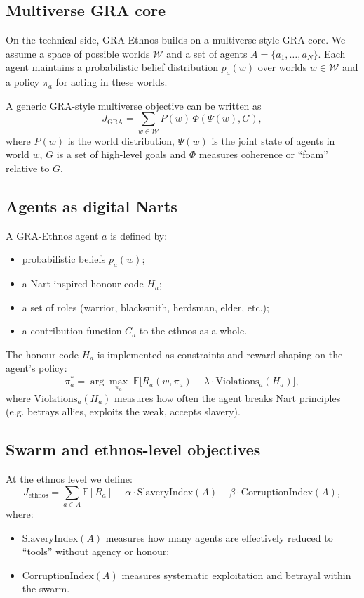 \documentclass[12pt,a4paper]{article}
\begin{document}
\subsection{Multiverse GRA core}

On the technical side, GRA-Ethnos builds on a multiverse-style GRA core. 
We assume a space of possible worlds $\mathcal{W}$ and a set of agents $A = \{a_1,\dots,a_N\}$.
Each agent maintains a probabilistic belief distribution $p_a(w)$ over worlds $w \in \mathcal{W}$ and a policy $\pi_a$ for acting in these worlds.

A generic GRA-style multiverse objective can be written as
\[
J_{\text{GRA}} = \sum_{w \in \mathcal{W}} P(w) \, \Phi(\Psi(w), G),
\]
where $P(w)$ is the world distribution, $\Psi(w)$ is the joint state of agents in world $w$, $G$ is a set of high-level goals and $\Phi$ measures coherence or ``foam'' relative to $G$.

\subsection{Agents as digital Narts}

A GRA-Ethnos agent $a$ is defined by:
\begin{itemize}
  \item probabilistic beliefs $p_a(w)$;
  \item a Nart-inspired honour code $H_a$;
  \item a set of roles (warrior, blacksmith, herdsman, elder, etc.);
  \item a contribution function $C_a$ to the ethnos as a whole.
\end{itemize}

The honour code $H_a$ is implemented as constraints and reward shaping on the agent's policy:
\[
\pi_a^* = \arg\max_{\pi_a} \; \mathbb{E}\big[ R_a(w, \pi_a) - \lambda \cdot \text{Violations}_a(H_a) \big],
\]
where $\text{Violations}_a(H_a)$ measures how often the agent breaks Nart principles (e.g. betrays allies, exploits the weak, accepts slavery).

\subsection{Swarm and ethnos-level objectives}

At the ethnos level we define:
\[
J_{\text{ethnos}} = \sum_{a \in A} \mathbb{E}[R_a] - \alpha \cdot \text{SlaveryIndex}(A) - \beta \cdot \text{CorruptionIndex}(A),
\]
where:
\begin{itemize}
  \item $\text{SlaveryIndex}(A)$ measures how many agents are effectively reduced to ``tools'' without agency or honour;
  \item $\text{CorruptionIndex}(A)$ measures systematic exploitation and betrayal within the swarm.
\end{itemize}
\end{document}

